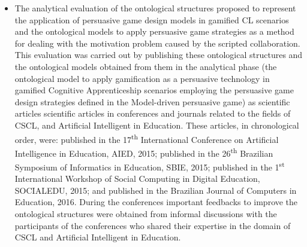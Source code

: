 \begin{description}
\begin{itemize}
\item
The analytical evaluation of the ontological structures proposed to represent the application of persuasive game design models in gamified CL scenarios and the ontological models to apply persuasive game strategies as a method for dealing with the motivation problem caused by the scripted collaboration. This evaluation was carried out by publishing these ontological structures and the ontological models obtained from them in the analytical phase (the ontological model to apply gamification as a persuasive technology in gamified Cognitive Apprenticeship scenarios employing the persuasive game design strategies defined in the Model-driven persuasive game) as scientific articles scientific articles in conferences and journals related to the fields of CSCL, and Artificial Intelligent in Education. These articles, in chronological order, were:  published in the 17\textsuperscript{th} International Conference on Artificial Intelligence in Education, AIED, 2015;  published in the 26\textsuperscript{th} Brazilian Symposium of Informatics in Education, SBIE, 2015;  published in the 1\textsuperscript{st} International Workshop of Social Computing in Digital Education, SOCIALEDU, 2015; and  published in the Brazilian Journal of Computers in Education, 2016. During the conferences important feedbacks to improve the ontological structures were obtained from informal discussions with the participants of the conferences who shared their expertise in the domain of CSCL and Artificial Intelligent in Education.


\end{itemize}
\end{description}
